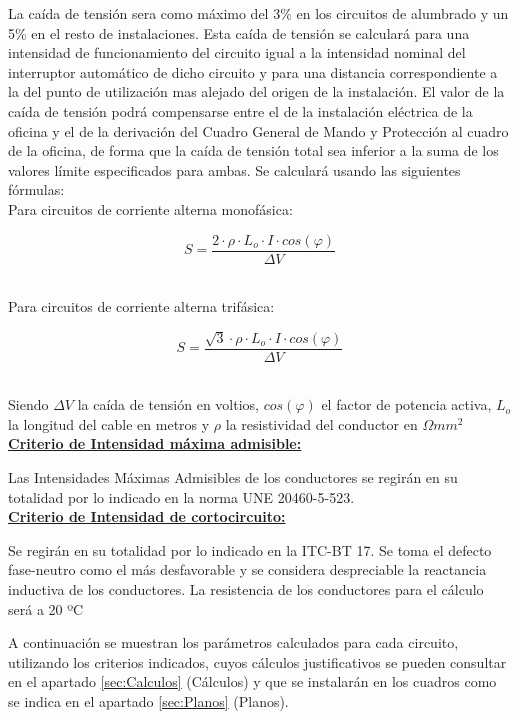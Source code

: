 La caída de tensión sera como máximo del 3\% en los circuitos de alumbrado y un 5\% en el resto de instalaciones. Esta caída de tensión se calculará para una intensidad de funcionamiento del circuito igual a la intensidad nominal del interruptor automático de dicho circuito y para una distancia correspondiente a la del punto de utilización mas alejado del origen de la instalación. El valor de la caída de tensión podrá compensarse entre el de la instalación eléctrica de la oficina y el de la derivación del Cuadro General de Mando y Protección al cuadro de la oficina, de forma que la caída de tensión total sea inferior a la suma de los valores límite especificados para ambas. Se calculará usando las siguientes fórmulas:\\

Para circuitos de corriente alterna monofásica:\

$$ S=\frac{2\cdot \rho \cdot L_o	\cdot I\cdot cos(\varphi)}{\Delta V}$$\

Para circuitos de corriente alterna trifásica:\

$$ S=\frac{\sqrt{3} \cdot \rho \cdot L_o \cdot I\cdot cos(\varphi)}{\Delta V}$$\

Siendo $\Delta V$ la caída de tensión en voltios, $cos(\varphi)$ el factor de potencia activa, $L_o$ la longitud del cable en metros y $\rho$ la resistividad del conductor en $\Omega mm^2$\\


\underline{\bfseries Criterio de Intensidad máxima admisible:}\

Las Intensidades Máximas Admisibles de los conductores se regirán en su totalidad por lo indicado en la norma UNE 20460-5-523.\\

\underline{\bfseries Criterio de Intensidad de cortocircuito:}\

Se regirán en su totalidad por lo indicado en la ITC-BT 17. Se toma el defecto fase-neutro como el más desfavorable y se considera despreciable la reactancia inductiva de los conductores. La resistencia de los conductores para el cálculo será a 20 ºC\\
\pagebreak

A continuación se muestran los parámetros calculados para cada circuito, utilizando los criterios indicados, cuyos cálculos justificativos se pueden consultar en el apartado \ref{sec:Calculos} (Cálculos) y que se instalarán en los cuadros como se indica en el apartado  \ref{sec:Planos} (Planos).

